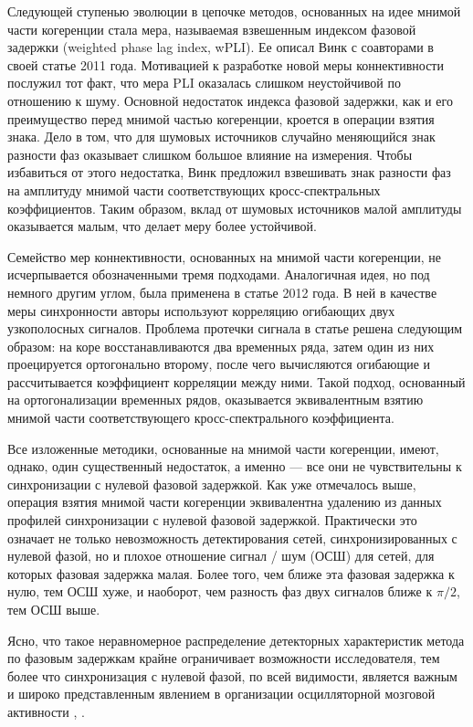 Следующей ступенью эволюции в цепочке методов, основанных на идее мнимой части когеренции стала
мера, называемая взвешенным индексом фазовой задержки (weighted phase lag index, wPLI). Ее описал Винк с
соавторами в своей статье 2011 года. Мотивацией к разработке новой меры коннективности послужил тот
факт, что мера PLI оказалась слишком неустойчивой по отношению к шуму. Основной недостаток индекса фазовой
задержки, как и его преимущество перед мнимой частью когеренции, кроется в операции взятия знака.
Дело в том, что для шумовых источников случайно меняющийся знак разности фаз оказывает слишком большое
влияние на измерения. Чтобы избавиться от этого недостатка, Винк предложил взвешивать знак разности фаз
на амплитуду мнимой части соответствующих кросс-спектральных коэффициентов. Таким образом, вклад от шумовых
источников малой амплитуды оказывается малым, что делает меру более устойчивой.

Семейство мер коннективности, основанных на мнимой части когеренции, не исчерпывается обозначенными
тремя подходами. Аналогичная идея, но под немного другим углом, была применена в статье
 2012 года. В ней в качестве меры синхронности
авторы используют корреляцию огибающих двух узкополосных сигналов. Проблема протечки сигнала
в статье решена следующим образом:
на коре восстанавливаются два временных ряда, затем один из них проецируется ортогонально второму,
после чего вычисляются огибающие и рассчитывается коэффициент корреляции между ними.
Такой подход, основанный на ортогонализации временных рядов, оказывается эквивалентным взятию
мнимой части  соответствующего кросс-спектрального коэффициента.



Все изложенные методики, основанные на мнимой части когеренции, имеют,
однако, один существенный недостаток, а именно --- все они не чувствительны к
синхронизации с нулевой фазовой задержкой. Как уже отмечалось выше, операция
взятия мнимой части когеренции эквивалентна удалению из данных профилей синхронизации
с нулевой фазовой задержкой. Практически это означает не только невозможность детектирования
сетей, синхронизированных с нулевой фазой, но и плохое отношение сигнал / шум (ОСШ) для
сетей, для которых фазовая задержка малая. Более того, чем ближе эта фазовая задержка к нулю,
тем ОСШ хуже, и наоборот, чем разность фаз двух сигналов ближе к $\pi / 2$, тем ОСШ выше.

Ясно, что такое неравномерное распределение детекторных характеристик метода по
фазовым задержкам крайне ограничивает возможности исследователя, тем более что
синхронизация с нулевой фазой, по всей видимости, является важным и широко представленным
явлением в организации осцилляторной мозговой активности \cite{}, \cite{}.

